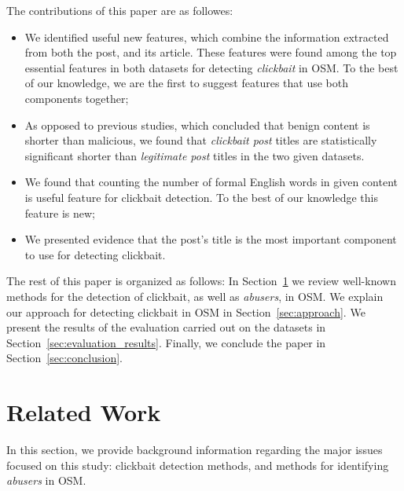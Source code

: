 \documentclass{sig-alternate}
\begin{document}
The contributions of this paper are as followes:
\begin{itemize}
	
	\item We identified useful new features, which combine the information extracted from both the post, and its article. 
	These features were found among the top essential features in both datasets for detecting \emph{clickbait} in OSM.  
	To the best of our knowledge, we are the first to suggest features that use both components together;
	\item As opposed to previous studies, which concluded that benign content is shorter than malicious, we found that \emph{clickbait post} titles are statistically significant shorter than \emph{legitimate post} titles in the two given datasets. 
	\item We found that counting the number of formal English words in given content is useful feature for clickbait detection. 
	To the best of our knowledge this feature is new;
	\item We presented evidence that the post's title is the most important component to use for detecting clickbait.
\end{itemize}


The rest of this paper is organized as follows: 
In Section~\ref{sec:related_work} we review well-known methods for the detection of clickbait, as well as \emph{abusers}, in OSM.  
We explain our approach for detecting clickbait in OSM in Section~\ref{sec:approach}.
We present the results of the evaluation carried out on the datasets in Section~\ref{sec:evaluation_results}.  
Finally, we conclude the paper in Section~\ref{sec:conclusion}. %


\section{Related Work}
\label{sec:related_work}

In this section, we provide background information regarding the major issues focused on this study: clickbait detection methods, and methods for identifying \emph{abusers} in OSM. 
\end{document}
